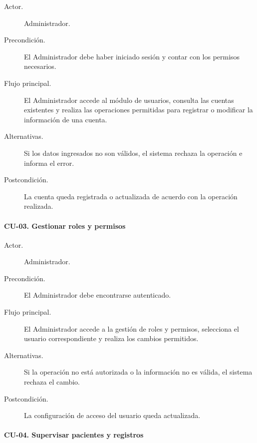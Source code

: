 \begin{description}
	
	\item[Actor.] Administrador.
	
	\item[Precondición.] El Administrador debe haber iniciado sesión y contar con
	los permisos necesarios.
	
	\item[Flujo principal.] El Administrador accede al módulo de usuarios,
	consulta las cuentas existentes y realiza las operaciones permitidas para
	registrar o modificar la información de una cuenta.
	
	\item[Alternativas.] Si los datos ingresados no son válidos, el sistema
	rechaza la operación e informa el error.
	
	\item[Postcondición.] La cuenta queda registrada o actualizada de acuerdo con
	la operación realizada.
	
\end{description}


\paragraph{CU-03. Gestionar roles y permisos}

\begin{description}
	
	\item[Actor.] Administrador.
	
	\item[Precondición.] El Administrador debe encontrarse autenticado.
	
	\item[Flujo principal.] El Administrador accede a la gestión de roles y
	permisos, selecciona el usuario correspondiente y realiza los cambios
	permitidos.
	
	\item[Alternativas.] Si la operación no está autorizada o la información no
	es válida, el sistema rechaza el cambio.
	
	\item[Postcondición.] La configuración de acceso del usuario queda actualizada.
	
\end{description}


\paragraph{CU-04. Supervisar pacientes y registros}

